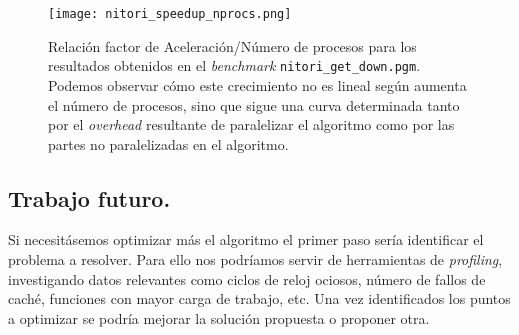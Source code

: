 \begin{figure}[H]
    \centering
    \texttt{[image: nitori\_speedup\_nprocs.png]}
    \caption{Relación factor de Aceleración/Número de procesos para los resultados obtenidos en el \textit{benchmark} \texttt{nitori\_get\_down.pgm}.
    Podemos observar cómo este crecimiento no es lineal según aumenta el número de procesos, sino que sigue una curva determinada tanto por el \textit{overhead}
    resultante de paralelizar el algoritmo como por las partes no paralelizadas en el algoritmo.}
\end{figure}

\subsection{Trabajo futuro.}

Si necesitásemos optimizar más el algoritmo el primer paso sería identificar el problema a resolver. Para ello nos
podríamos servir de herramientas de \textit{profiling}, investigando datos relevantes como ciclos de reloj ociosos,
número de fallos de caché, funciones con mayor carga de trabajo, etc. Una vez identificados los puntos a optimizar
se podría mejorar la solución propuesta o proponer otra.
